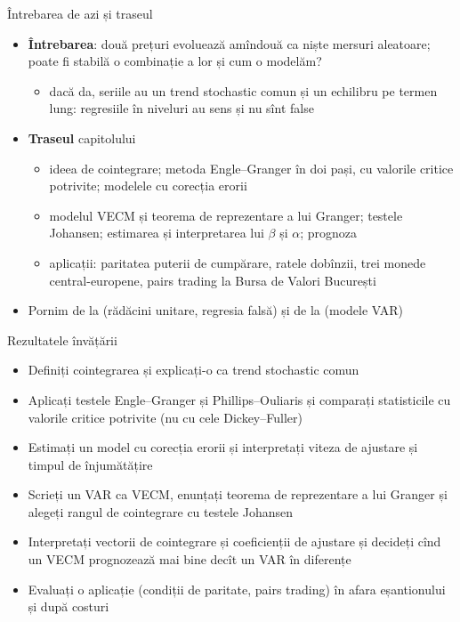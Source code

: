 \begin{frame}{Întrebarea de azi și traseul}
\itemsize{\small}
\begin{itemize}
    \item \textbf{Întrebarea}: două prețuri evoluează amîndouă ca niște mersuri aleatoare; poate fi stabilă o combinație a lor și cum o modelăm?
    \begin{itemize}
        \item dacă da, seriile au un trend stochastic comun și un echilibru pe termen lung: regresiile în niveluri au sens și nu sînt false
    \end{itemize}
    \item \textbf{Traseul} capitolului
    \begin{itemize}
        \item ideea de cointegrare; metoda Engle--Granger în doi pași, cu valorile critice potrivite; modelele cu corecția erorii
        \item modelul VECM și teorema de reprezentare a lui Granger; testele Johansen; estimarea și interpretarea lui $\beta$ și $\alpha$; prognoza
        \item aplicații: paritatea puterii de cumpărare, ratele dobînzii, trei monede central-europene, pairs trading la Bursa de Valori București
    \end{itemize}
    \item Pornim de la  (rădăcini unitare, regresia falsă) și de la  (modele VAR)
\end{itemize}
\end{frame}

\begin{frame}{Rezultatele învățării}
\itemsize{\small}
\begin{itemize}
    \item Definiți cointegrarea și explicați-o ca trend stochastic comun
    \item Aplicați testele Engle--Granger și Phillips--Ouliaris și comparați statisticile cu valorile critice potrivite (nu cu cele Dickey--Fuller)
    \item Estimați un model cu corecția erorii și interpretați viteza de ajustare și timpul de înjumătățire
    \item Scrieți un VAR ca VECM, enunțați teorema de reprezentare a lui Granger și alegeți rangul de cointegrare cu testele Johansen
    \item Interpretați vectorii de cointegrare și coeficienții de ajustare și decideți cînd un VECM prognozează mai bine decît un VAR în diferențe
    \item Evaluați o aplicație (condiții de paritate, pairs trading) în afara eșantionului și după costuri
\end{itemize}
\end{frame}

